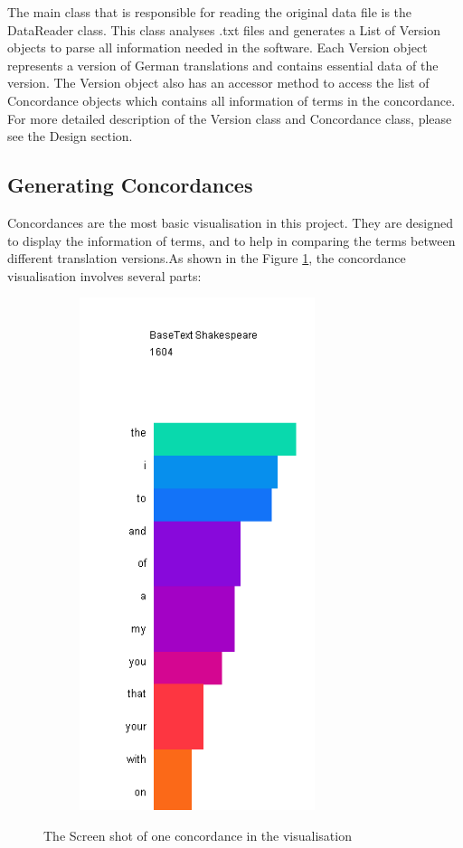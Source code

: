 The main class that is responsible for reading the original data file is the DataReader class. This class analyses .txt files and generates a List of Version objects to parse all information needed in the software. Each Version object represents a version of German translations and contains essential data of the version. The Version object also has an accessor method to access the list of Concordance objects which contains all information of terms in the concordance. For more detailed description of the Version class and Concordance class, please see the Design section.

\subsection{Generating Concordances}

Concordances are the most basic visualisation in this project. They are designed to display the information of terms, and to help in comparing the terms between different translation versions.As shown in the Figure \ref{fig:condorVis}, the concordance visualisation involves several parts:
\begin{figure}[h]
	\centering	
	\includegraphics[width=9cm, height=15cm]{Figs/condordanceVis}\\[1ex]
	\caption{The Screen shot of one concordance in the visualisation}
	\label{fig:condorVis}
\end{figure} 


